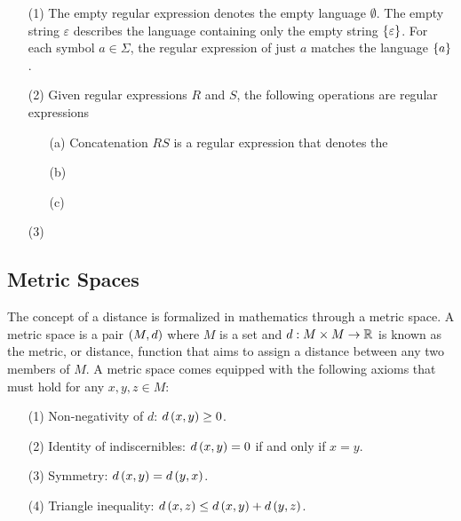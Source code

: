 \begin{enumerate}
  \item[(1)]
    The empty regular expression denotes the empty language \(\emptyset\).
    The empty string \(\varepsilon\) describes the
    language containing only the empty string \(\left\{\varepsilon\right\}\).
    For each symbol \(a \in \Sigma\), 
    the regular expression of just \(a\) matches the language
    \(\left\{a\right\}\).

  \item[(2)]
    Given regular expressions \(R\) and \(S\),
    the following operations are regular expressions
    \begin{enumerate}
      \item[(a)]
        Concatenation \(RS\) is a regular expression that denotes
        the 

      \item[(b)]
      
      \item[(c)]
    \end{enumerate}

  \item[(3)]
\end{enumerate}

\fi



\subsection{Metric Spaces}

The concept of a distance is formalized in mathematics through a metric space.
A metric space is a pair \(\left(M, d\right)\) where \(M\) is a set
and \(d : M \times M \to \mathbb{R}\) is known as the metric, or distance,
function that aims to assign a distance between any two members of \(M\).
A metric space comes equipped with the following axioms
that must hold for any \(x, y, z \in M\):
\begin{enumerate}
  \item[(1)]
    Non-negativity of \(d\): \(d\left(x, y\right) \geq 0\).

  \item[(2)]
    Identity of indiscernibles:
    \(d\left(x, y\right) = 0\) if and only if \(x = y\).

  \item[(3)]
    Symmetry:
    \(d\left(x, y\right) = d\left(y, x\right)\).

  \item[(4)]
    Triangle inequality:
    \(d\left(x, z\right) \leq d\left(x, y\right) + d\left(y, z\right)\).

\end{enumerate}


